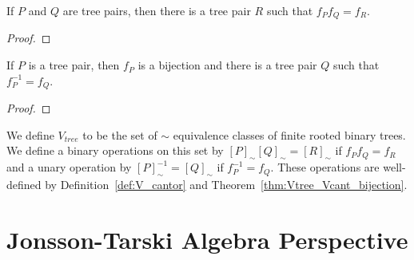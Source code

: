 \begin{lemma}\label{lem:V_is_semigroup}
    If \(P\) and \(Q\) are tree pairs, then there is a tree pair \(R\) such that \(f_Pf_Q=f_R\). 
\end{lemma}
\begin{proof}
\end{proof}
\begin{lemma}\label{lem:V_has_inverses}
    If \(P\) is a tree pair, then \(f_P\) is a bijection and there is a tree pair \(Q\) such that \(f_P^{-1}=f_Q\).
\end{lemma}
\begin{proof}
\end{proof}

\begin{definition}\label{def:V_tree_pair}
    We define \(V_{tree}\) to be the set of \(\sim\) equivalence classes of finite rooted binary trees.
    We define a binary operations on this set by \([P]_{\sim}[Q]_{\sim}=[R]_{\sim}\) if \(f_Pf_Q=f_R\) and a unary operation by \([P]_{\sim}^{-1}=[Q]_{\sim}\) if \(f_P^{-1}=f_Q\).
    These operations are well-defined by Definition~\ref{def:V_cantor} and Theorem~\ref{thm:Vtree_Vcant_bijection}.
\end{definition}
\section{Jonsson-Tarski Algebra Perspective}

